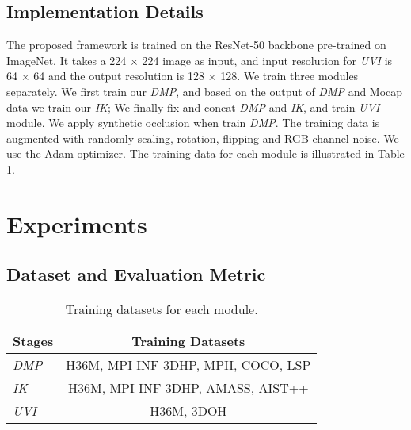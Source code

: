 \documentclass[10pt,twocolumn,letterpaper]{article}
\begin{document}
\subsection{Implementation Details}

The proposed framework is trained on the ResNet-50 \cite{resnet} backbone pre-trained on ImageNet. It takes a 224 $\times$ 224 image as input, and input resolution for  \textit{UVI}  is 64 $\times$ 64 and the output resolution is 128 $\times$ 128. 
We train three modules separately. We first train our \textit{DMP}, and based on the output of  \textit{DMP} and Mocap data we train our \textit{IK}; We finally fix and concat \textit{DMP} and \textit{IK}, and train \textit{UVI} module. We apply synthetic occlusion \cite{SyntheticOcclusion} when train \textit{DMP}. The training data is augmented with randomly scaling, rotation, flipping and RGB channel noise. We use the Adam optimizer. The training data for each module is illustrated in Table \ref{table:traingset}.

\section{Experiments}

\subsection{Dataset and Evaluation Metric}
 
\begin{table}
\begin{center}
\small
\begin{tabular}{l|c}
\hline
Stages  & Training Datasets  \\
\hline
\textit{DMP}  & H36M, MPI-INF-3DHP, MPII, COCO, LSP\\ \textit{IK}   & H36M, MPI-INF-3DHP, AMASS, AIST++     \\ \textit{UVI}   & H36M, 3DOH \\ \hline
\end{tabular}
\end{center}
\caption{Training datasets for each module.}
\label{table:traingset}
\end{table}

 
 
\end{document}
